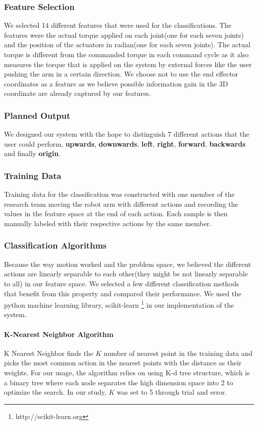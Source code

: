 \subsubsection{Feature Selection}
We selected 14 different features that were used for the classifications. The features were the actual torque applied on each joint(one for each seven joints) and the position of the actuators in radian(one for each seven joints). The actual torque is different from the commanded torque in each command cycle as it also measures the torque that is applied on the system by external forces like the user pushing the arm in a certain direction. We choose not to use the end effector coordinates as a feature as we believe possible information gain in the 3D coordinate are already captured by our features.

\subsubsection{Planned Output}
We designed our system with the hope to distinguish 7 different actions that the user could perform, \textbf{upwards}, \textbf{downwards}, \textbf{left}, \textbf{right}, \textbf{forward}, \textbf{backwards} and finally \textbf{origin}.

\subsubsection{Training Data}
Training data for the classification was constructed with one member of the research team moving the robot arm with different actions and recording the values in the feature space at the end of each action. Each sample is then manually labeled with their respective actions by the same member.

\subsubsection{Classification Algorithms}
Because the way motion worked and the problem space, we believed the different actions are linearly separable to each other(they might be not linearly separable to all) in our feature space. We selected a few different classification methods that benefit from this property and compared their performance. We used the python machine learning library, scikit-learn \footnote{http://scikit-learn.org} in our implementation of the system.

\paragraph{K-Nearest Neighbor Algorithm}
K Nearest Neighbor finds the $K$ number of nearest point in the training data and picks the most common action in the nearest points with the distance as their weights. For our usage, the algorithm relies on using K-d tree structure, which is a binary tree where each node separates the high dimension space into 2 to optimize the search. In our study, $K$ was set to 5 through trial and error.

